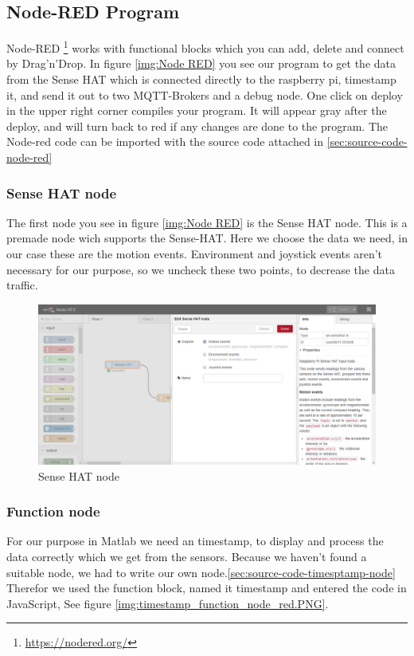 \documentclass[12pt]{article}
\begin{document}
\newpage

\subsection{Node-RED Program}\label{sec:Node-RED Program}
Node-RED \footnote{\url{https://nodered.org/}} works with functional blocks which you can add, delete and connect by Drag'n'Drop. In figure \ref{img:Node RED} you see our program to get the data from the Sense HAT which is connected directly to the raspberry pi, timestamp it, and send it out to two MQTT-Brokers and a debug node. One click on deploy in the upper right corner compiles your program. It will appear gray after the deploy, and will turn back to red if any changes are done to the program. The Node-red code can be imported with the source code attached in \ref{sec:source-code-node-red}

\subsubsection{Sense HAT node}
The first node you see in figure \ref{img:Node RED} is the Sense HAT node. This is a premade node wich supports the Sense-HAT. Here we choose the data we need, in our case these are the motion events. Environment and joystick events aren't necessary for our purpose, so we uncheck these two points, to decrease the data traffic. 

\begin{figure}[H]
	\includegraphics[width=\textwidth]{Sense_Hat_node.PNG}
	\caption{Sense HAT node}
	\label{img:Sense_Hat_node}
\end{figure}

\subsubsection{Function node}
For our purpose in Matlab we need an timestamp, to display and process the data correctly which we get from the sensors. Because we haven't found a suitable node, we had to write our own node.\ref{sec:source-code-timesptamp-node} Therefor we used the function block, named it timestamp and entered the code in JavaScript, See figure \ref{img:timestamp_function_node_red.PNG}. 
\end{document}
